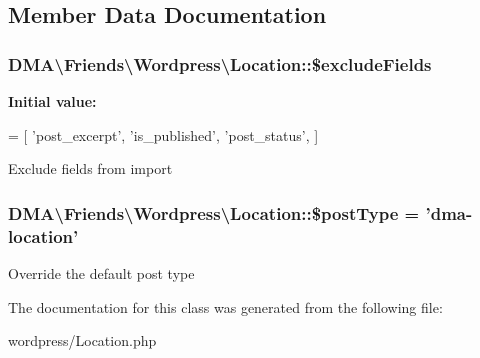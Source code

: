 \subsection{Member Data Documentation}
\hypertarget{classDMA_1_1Friends_1_1Wordpress_1_1Location_ae18a475210d12a42d335d6ca6fb47811}{
\subsubsection[{\$exclude\+Fields}]{\setlength{\rightskip}{0pt plus 5cm}D\+M\+A\textbackslash{}\+Friends\textbackslash{}\+Wordpress\textbackslash{}\+Location\+::\$exclude\+Fields\hspace{0.3cm}{\ttfamily [protected]}}}\label{classDMA_1_1Friends_1_1Wordpress_1_1Location_ae18a475210d12a42d335d6ca6fb47811}
{\bfseries Initial value\+:}
\begin{DoxyCode}
= [
        \textcolor{stringliteral}{'post\_excerpt'},
        \textcolor{stringliteral}{'is\_published'},
        \textcolor{stringliteral}{'post\_status'},
    ]
\end{DoxyCode}
Exclude fields from import \hypertarget{classDMA_1_1Friends_1_1Wordpress_1_1Location_a40f4ecf15a53d860bfbba3484f2999bf}{
\subsubsection[{\$post\+Type}]{\setlength{\rightskip}{0pt plus 5cm}D\+M\+A\textbackslash{}\+Friends\textbackslash{}\+Wordpress\textbackslash{}\+Location\+::\$post\+Type = 'dma-\/location'}}\label{classDMA_1_1Friends_1_1Wordpress_1_1Location_a40f4ecf15a53d860bfbba3484f2999bf}
Override the default post type 

The documentation for this class was generated from the following file\+:\begin{DoxyCompactItemize}
\item 
wordpress/Location.\+php\end{DoxyCompactItemize}
